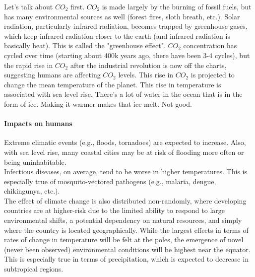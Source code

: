 \documentclass[12pt]{article}
\begin{document}
Let's talk about $CO_{2}$ first. $CO_{2}$ is made largely by the burning of fossil fuels, but has many environmental sources as well (forest fires, sloth breath, etc.). Solar radiation, particularly infrared radiation, becomes trapped by greenhouse gases, which keep infrared radiation closer to the earth (and infrared radiation is basically heat). This is called the "greenhouse effect". $CO_{2}$ concentration has cycled over time (starting about 400k years ago, there have been 3-4 cycles), but the rapid rise in $CO_{2}$ after the industrial revolution is now off the charts, suggesting humans are affecting $CO_{2}$ levels. This rise in $CO_{2}$ is projected to change the mean temperature of the planet. This rise in temperature is associated with sea level rise. There's a lot of water in the ocean that is in the form of ice. Making it warmer makes that ice melt. Not good. 

















\paragraph*{Impacts on humans}

Extreme climatic events (e.g., floods, tornadoes) are expected to increase. Also, with sea level rise, many coastal cities may be at risk of flooding more often or being uninhabitable. \\

Infectious diseases, on average, tend to be worse in higher temperatures. This is especially true of mosquito-vectored pathogens (e.g., malaria, dengue, chikingunya, etc.). \\

The effect of climate change is also distributed non-randomly, where developing countries are at higher-risk due to the limited ability to respond to large environmental shifts, a potential dependency on natural resources, and simply where the country is located geographically. While the largest effects in terms of rates of change in temperature will be felt at the poles, the emergence of novel (never been observed) environmental conditions will be highest near the equator. This is especially true in terms of precipitation, which is expected to decrease in subtropical regions. \\
\end{document}
